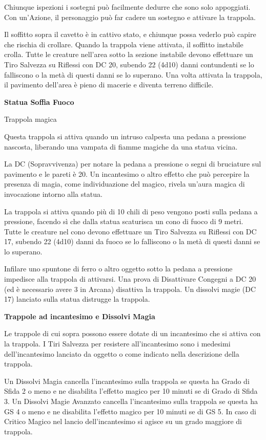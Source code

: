 \begin{multicols}{2}
Chiunque ispezioni i sostegni può facilmente dedurre che sono solo appoggiati. Con un'Azione, il personaggio può far cadere un sostegno e attivare la trappola.

Il soffitto sopra il cavetto è in cattivo stato, e chiunque possa vederlo può capire che rischia di crollare. Quando la trappola viene attivata, il soffitto instabile crolla. Tutte le creature nell'area sotto la sezione instabile devono effettuare un Tiro Salvezza su Riflessi con DC 20, subendo 22 (4d10) danni contundenti se lo falliscono o la metà di questi danni se lo superano. Una volta attivata la trappola, il pavimento dell'area è pieno di macerie e diventa terreno difficile.

\medskip

\textbf{Statua Soffia Fuoco}

Trappola magica

Questa trappola si attiva quando un intruso calpesta una pedana a pressione nascosta, liberando una vampata di fiamme magiche da una statua vicina.

La DC (Sopravvivenza) per notare la pedana a pressione o segni di bruciature sul pavimento e le pareti è 20. Un incantesimo o altro effetto che può percepire la presenza di magia, come individuazione del magico, rivela un'aura magica di invocazione intorno alla statua.

La trappola si attiva quando più di 10 chili di peso vengono posti sulla pedana a pressione, facendo sì che dalla statua scaturisca un cono di fuoco di 9 metri. Tutte le creature nel cono devono effettuare un Tiro Salvezza su Riflessi con DC 17, subendo 22 (4d10) danni da fuoco se lo falliscono o la metà di questi danni se lo superano.

Infilare uno spuntone di ferro o altro oggetto sotto la pedana a pressione impedisce alla trappola di attivarsi. Una prova di Disattivare Congegni a DC 20 (ed è necessario avere 3 in Arcana) disattiva la trappola. Un dissolvi magie (DC 17) lanciato sulla statua distrugge la trappola.

\medskip

\textbf{Trappole ad incantesimo e Dissolvi Magia}

Le trappole di cui sopra possono essere dotate di un incantesimo che si attiva con la trappola.
I Tiri Salvezza per resistere all'incantesimo sono i medesimi dell'incantesimo lanciato da oggetto o come indicato nella descrizione della trappola.

Un Dissolvi Magia cancella l'incantesimo sulla trappola se questa ha Grado di Sfida 2 o meno e ne disabilita l'effetto magico per 10 minuti se di Grado di Sfida 3.
Un Dissolvi Magie Avanzato cancella l'incantesimo sulla trappola se questa ha GS 4 o meno e ne disabilita l'effetto magico per 10 minuti se di GS 5. In caso di Critico Magico nel lancio dell'incantesimo si agisce su un grado maggiore di trappola.


\end{multicols}

